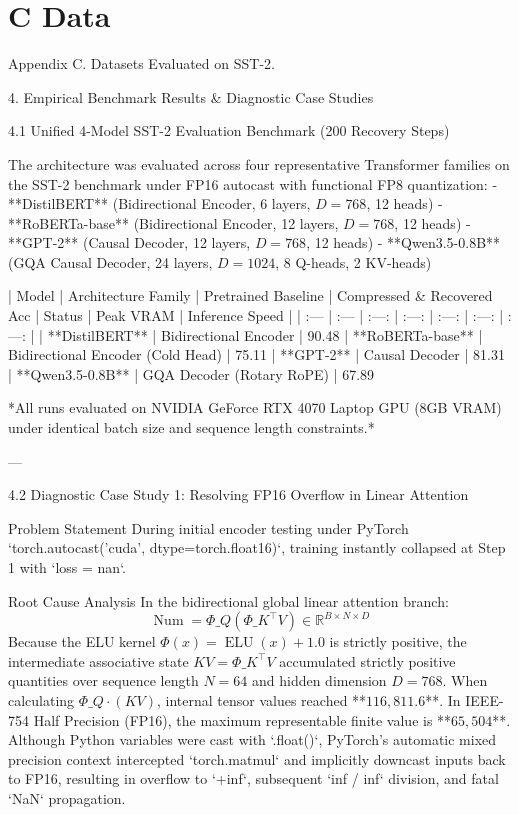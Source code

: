 \section{C Data}

 Appendix C. Datasets
Evaluated on SST-2.


 4. Empirical Benchmark Results \& Diagnostic Case Studies


 4.1 Unified 4-Model SST-2 Evaluation Benchmark (200 Recovery Steps)

The architecture was evaluated across four representative Transformer families on the SST-2 benchmark under FP16 autocast with functional FP8 quantization:
- **DistilBERT** (Bidirectional Encoder, 6 layers, $D=768$, 12 heads)
- **RoBERTa-base** (Bidirectional Encoder, 12 layers, $D=768$, 12 heads)
- **GPT-2** (Causal Decoder, 12 layers, $D=768$, 12 heads)
- **Qwen3.5-0.8B** (GQA Causal Decoder, 24 layers, $D=1024$, 8 Q-heads, 2 KV-heads)

| Model | Architecture Family | Pretrained Baseline | Compressed \& Recovered Acc | Status | Peak VRAM | Inference Speed |
| :--- | :--- | :---: | :---: | :---: | :---: | :---: |
| **DistilBERT** | Bidirectional Encoder | 90.48%
| **RoBERTa-base** | Bidirectional Encoder (Cold Head) | 75.11%
| **GPT-2** | Causal Decoder | 81.31%
| **Qwen3.5-0.8B** | GQA Decoder (Rotary RoPE) | 67.89%

*All runs evaluated on NVIDIA GeForce RTX 4070 Laptop GPU (8GB VRAM) under identical batch size and sequence length constraints.*

---

 4.2 Diagnostic Case Study 1: Resolving FP16 Overflow in Linear Attention

 Problem Statement
During initial encoder testing under PyTorch `torch.autocast('cuda', dtype=torch.float16)`, training instantly collapsed at Step 1 with `loss = nan`.

 Root Cause Analysis
In the bidirectional global linear attention branch:
$$\operatorname{Num} = \Phi\_Q \left(\Phi\_K^\top V\right) \in \mathbb{R}^{B \times N \times D}$$
Because the ELU kernel $\Phi(x) = \operatorname{ELU}(x) + 1.0$ is strictly positive, the intermediate associative state $KV = \Phi\_K^\top V$ accumulated strictly positive quantities over sequence length $N=64$ and hidden dimension $D=768$.
When calculating $\Phi\_Q \cdot (KV)$, internal tensor values reached **$116,811.6$**.
In IEEE-754 Half Precision (FP16), the maximum representable finite value is **$65,504$**.
Although Python variables were cast with `.float()`, PyTorch's automatic mixed precision context intercepted `torch.matmul` and implicitly downcast inputs back to FP16, resulting in overflow to `+inf`, subsequent `inf / inf` division, and fatal `NaN` propagation.

